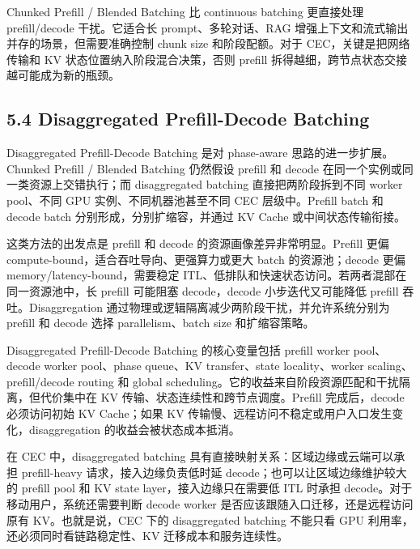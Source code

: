 \documentclass[a4paper,10pt]{ctexart}
\begin{document}
Chunked Prefill / Blended Batching 比 continuous batching 更直接处理 prefill/decode 干扰。它适合长 prompt、多轮对话、RAG 增强上下文和流式输出并存的场景，但需要准确控制 chunk size 和阶段配额。对于 CEC，关键是把网络传输和 KV 状态位置纳入阶段混合决策，否则 prefill 拆得越细，跨节点状态交接越可能成为新的瓶颈。


\subsection*{5.4 Disaggregated Prefill-Decode Batching}

Disaggregated Prefill-Decode Batching 是对 phase-aware 思路的进一步扩展。Chunked Prefill / Blended Batching 仍然假设 prefill 和 decode 在同一个实例或同一类资源上交错执行；而 disaggregated batching 直接把两阶段拆到不同 worker pool、不同 GPU 实例、不同机器池甚至不同 CEC 层级中。Prefill batch 和 decode batch 分别形成，分别扩缩容，并通过 KV Cache 或中间状态传输衔接。


这类方法的出发点是 prefill 和 decode 的资源画像差异非常明显。Prefill 更偏 compute-bound，适合吞吐导向、更强算力或更大 batch 的资源池；decode 更偏 memory/latency-bound，需要稳定 ITL、低排队和快速状态访问。若两者混部在同一资源池中，长 prefill 可能阻塞 decode，decode 小步迭代又可能降低 prefill 吞吐。Disaggregation 通过物理或逻辑隔离减少两阶段干扰，并允许系统分别为 prefill 和 decode 选择 parallelism、batch size 和扩缩容策略。


Disaggregated Prefill-Decode Batching 的核心变量包括 prefill worker pool、decode worker pool、phase queue、KV transfer、state locality、worker scaling、prefill/decode routing 和 global scheduling。它的收益来自阶段资源匹配和干扰隔离，但代价集中在 KV 传输、状态连续性和跨节点调度。Prefill 完成后，decode 必须访问初始 KV Cache；如果 KV 传输慢、远程访问不稳定或用户入口发生变化，disaggregation 的收益会被状态成本抵消。


在 CEC 中，disaggregated batching 具有直接映射关系：区域边缘或云端可以承担 prefill-heavy 请求，接入边缘负责低时延 decode；也可以让区域边缘维护较大的 prefill pool 和 KV state layer，接入边缘只在需要低 ITL 时承担 decode。对于移动用户，系统还需要判断 decode worker 是否应该跟随入口迁移，还是远程访问原有 KV。也就是说，CEC 下的 disaggregated batching 不能只看 GPU 利用率，还必须同时看链路稳定性、KV 迁移成本和服务连续性。
\end{document}
